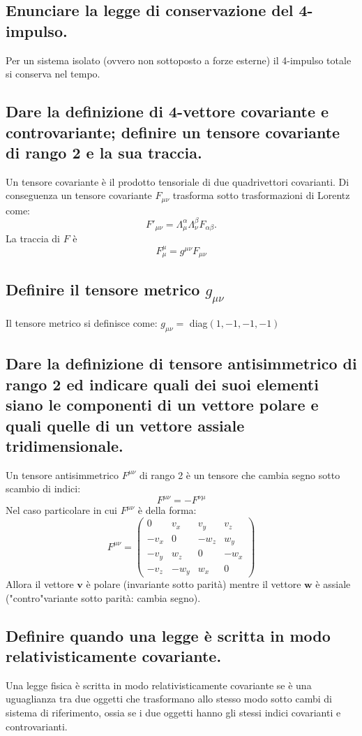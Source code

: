 \subsection[]{ Enunciare la legge di conservazione del 4-impulso.}
Per un sistema isolato (ovvero non sottoposto a forze esterne) il 4-impulso totale si conserva nel tempo.
\subsection[]{ Dare la definizione di 4-vettore covariante e controvariante; definire un tensore covariante di rango 2 e la sua traccia.}
\label{sec:1.a.10}
Un tensore covariante è il prodotto tensoriale di due quadrivettori covarianti. Di conseguenza un tensore covariante $F_{\mu \nu}$ trasforma sotto trasformazioni di Lorentz come:
\[
	F'_{\mu \nu} = \Lambda_{\mu}^{\alpha}\Lambda_{\nu}^{\beta} F_{\alpha \beta}  
.\]
La traccia di $F$ è 
\[
	F^{\mu}_{\mu} = g^{\mu \nu} F_{\mu \nu}
\] 
\subsection[]{Definire il tensore metrico $g_{\mu \nu}$}
Il tensore metrico si definisce come: $g_{\mu \nu} = $ diag$\left( 1,-1,-1,-1 \right) $ 
\subsection[]{Dare la definizione di tensore antisimmetrico di rango 2 ed indicare quali dei suoi elementi siano le componenti di un vettore polare e quali quelle di un vettore assiale tridimensionale.}
Un tensore antisimmetrico $F^{\mu \nu}$ di rango 2 è un tensore che cambia segno sotto scambio di indici:
\[
	F^{\mu \nu} = -F^{\nu \mu}
\]
Nel caso particolare in cui $F^{\mu \nu}$ è della forma:
\[
	F^{\mu \nu} = 
\left( 
\begin{array}{c|ccc}
	0 & v_{x} & v_{y} & v_{z} \\
	\hline
	-v_{x} & 0 & -w_{z} & w_{y} \\
	-v_{y} & w_{z} & 0 & -w_{x} \\
	-v_{z} & -w_{y} & w_{x} & 0
\end{array}
\right) 
\] 
Allora il vettore $\boldsymbol{v}$ è polare (invariante sotto parità) mentre il vettore $\boldsymbol{w}$ è assiale ("contro"variante sotto parità: cambia segno).
\subsection[]{ Definire quando una legge è scritta in modo relativisticamente covariante.}
Una legge fisica è scritta in modo relativisticamente covariante se è una uguaglianza tra due oggetti che trasformano allo stesso modo sotto cambi di sistema di riferimento, ossia se i due oggetti hanno gli stessi indici covarianti e controvarianti. 

